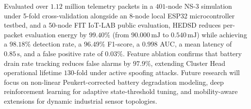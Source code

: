 \documentclass[conference]{IEEEtran}
\begin{document}
Evaluated over $1.12$ million telemetry packets in a $401$-node NS-3 simulation under 5-fold cross-validation alongside an 8-node local ESP32 microcontroller testbed, and a 50-node FIT IoT-LAB public evaluation, HEDSD reduces per-packet evaluation energy by $99.40\%$ (from $90.000\,\text{mJ}$ to $0.540\,\text{mJ}$) while achieving a $98.18\%$ detection rate, a $96.49\%$ F1-score, a $0.998$ AUC, a mean latency of $0.85\,\text{s}$, and a false positive rate of $0.03\%$. Feature ablation confirms that battery drain rate tracking reduces false alarms by $97.9\%$, extending Cluster Head operational lifetime $130$-fold under active spoofing attacks. Future research will focus on non-linear Peukert-corrected battery degradation modeling, deep reinforcement learning for adaptive state-threshold tuning, and mobility-aware extensions for dynamic industrial sensor topologies.
\end{document}
